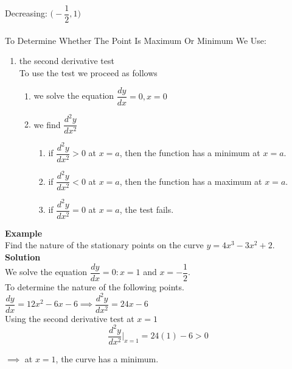 \documentclass[11pt,a4paper]{article}
\begin{document}
Decreasing: $\bigg(-\dfrac{1}{2},1\bigg)$\\\\












\pagebreak
To Determine Whether The Point Is Maximum Or Minimum We Use:
\begin{enumerate}
\item[] the second derivative test \\

To use the test we proceed as follows
\begin{enumerate}
     \item we solve the equation $\dfrac{dy}{dx}=0, x=0$
     \item we find $\dfrac{d^2y}{dx^2}$
\begin{enumerate}
             \item if $\dfrac{d^2y}{dx^2}>0$ at $x=a$, then the function has a minimum at $x=a$.
             
             \item if $\dfrac{d^2y}{dx^2}<0$ at $x=a$, then the function has a maximum at $x=a$.
             
             \item if $\dfrac{d^2y}{dx^2}=0$ at $x=a$, the test fails.\\
\end{enumerate}
\end{enumerate}
\end{enumerate}



\textbf{Example}\\
Find the nature of the stationary points on the curve $y=4x^3-3x^2+2$.\\


\textbf{Solution}\\
We solve the equation $\dfrac{dy}{dx}=0:x=1$ and $x=-\dfrac{1}{2}$.\\
To determine the nature of the following points.\\

$\dfrac{dy}{dx}=12x^2-6x-6\implies \dfrac{d^2y}{dx^2}=24x-6$\\


Using the second derivative test at $x=1$
$$\frac{d^2y}{dx^2}\Bigg|_{x=1}=24(1)-6>0$$

$\implies$ at $x=1$, the curve has a minimum.\\
\end{document}
